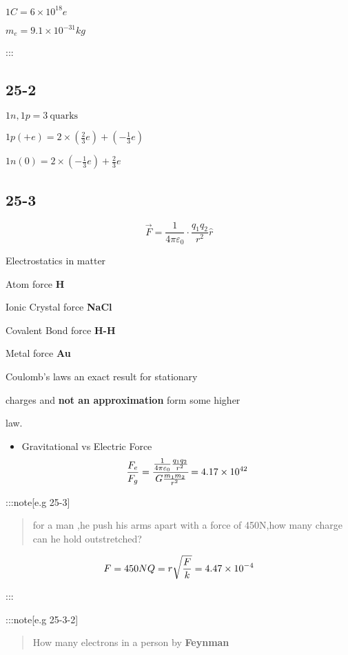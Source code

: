 \documentclass[
]{article}
\providecommand{\tightlist}{%
  \setlength{\itemsep}{0pt}\setlength{\parskip}{0pt}}
\begin{document}
\(1C=6\times 10^{18}e\)

\(m_e=9.1\times 10^{-31}kg\)

:::

\hypertarget{section}{%
\subsection{25-2}\label{section}}

\(1n,1p=3 \mathrm{~quarks}\)

\(1p(+e)=2\times (\frac{2}{3}e)+(-\frac{1}{3}e)\)

\(1n(0)=2\times (-\frac{1}{3}e)+\frac{2}{3}e\)

\hypertarget{section-1}{%
\subsection{25-3}\label{section-1}}

\[
\vec F=\frac{1}{4\pi \varepsilon _0} \cdot \frac{q_1q_2}{r^2}\hat r
\]

Electrostatics in matter

Atom force \textbf{H}

Ionic Crystal force \textbf{NaCl}

Covalent Bond force \textbf{H-H}

Metal force \textbf{Au}

Coulomb's laws an exact result for stationary

charges and \textbf{not an approximation} form some higher

law.

\begin{itemize}
\tightlist
\item
  Gravitational vs Electric Force \[
  \frac{F_e}{F_g}=\cfrac{\frac{1}{4\pi \varepsilon _0}\frac{q_1q_2}{r^2}}{G\frac{m_1m_2}{r^2}}=4.17\times 10^{42}
  \]
\end{itemize}

:::note{[}e.g 25-3{]}

\begin{quote}
for a man ,he push his arms apart with a force of 450N,how many charge
can he hold outstretched?
\end{quote}

\[
F=450N\\
Q=r\sqrt{\frac{F}{k}}=4.47\times 10^{-4}
\]

:::

:::note{[}e.g 25-3-2{]}

\begin{quote}
How many electrons in a person by \textbf{Feynman}
\end{quote}
\end{document}
